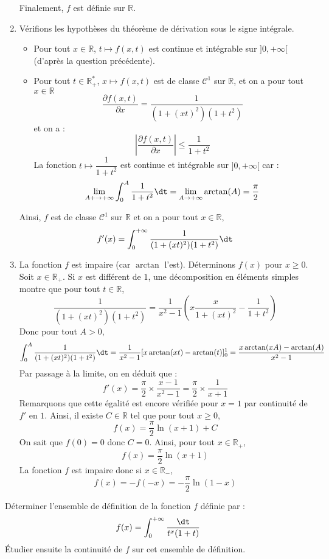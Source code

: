 \documentclass[a4paper,10pt]{report}
\begin{document}
\begin{enumerate}
\noindent Finalement, $f$ est définie sur $\mathbb{R}$.
\item Vérifions les hypothèses du théorème de dérivation sous le signe intégrale.
\begin{itemize}
\item Pour tout $x \in \mathbb{R}$, $t \mapsto f(x,t)$ est continue et intégrable sur $]0, + \infty[$ (d'après la question précédente).
\item Pour tout $t \in \mathbb{R}_+^{*}$, $x \mapsto f(x,t)$ est de classe $\mathcal{C}^1$ sur $\mathbb{R}$, et on a pour tout $x \in \mathbb{R}$
$$ \dfrac{\partial f(x,t)}{\partial x} = \dfrac{1}{(1+(xt)^2)(1+t^2)}$$
et on a :
$$ \left\vert \dfrac{\partial f(x,t)}{\partial x} \right\vert \leq \dfrac{1}{1+t^2}$$
La fonction $t \mapsto \dfrac{1}{1+t^2}$ est continue et intégrable sur $]0, + \infty[$ car :
$$ \lim_{A + \rightarrow + \infty} \int_{0}^A \dfrac{1}{1+t^2} \dt = \lim_{A \rightarrow + \infty} \arctan(A) = \dfrac{\pi}{2}$$
\end{itemize}
Ainsi, $f$ est de classe $\mathcal{C}^1$ sur $\mathbb{R}$ et on a pour tout $x \in \mathbb{R}$,
$$ f'(x) = \int_{0}^{+ \infty} \dfrac{1}{(1+(xt)^2)(1+t^2)} \dt$$
\item La fonction $f$ est impaire (car $\arctan$ l'est). Déterminons $f(x)$ pour $x \geq 0$. Soit $x \in \mathbb{R}_+$. Si $x$ est différent de $1$, une décomposition en éléments simples montre que pour tout $t \in \mathbb{R}$,
$$ \dfrac{1}{(1+(xt)^2)(1+t^2)} = \dfrac{1}{x^2-1} \left( x\dfrac{x}{1+(xt)^2} - \dfrac{1}{1+t^2} \right)$$
Donc pour tout $A>0$,
$$ \int_{0}^A \dfrac{1}{(1+(xt)^2)(1+t^2)} \dt = \dfrac{1}{x^2-1} [ x \arctan(xt)- \arctan(t) ]_0^1 = \dfrac{x\arctan(xA) - \arctan(A)}{x^2-1}$$
Par passage à la limite, on en déduit que :
$$ f'(x) = \dfrac{\pi}{2} \times \dfrac{x-1}{x^2-1} = \dfrac{\pi}{2} \times \dfrac{1}{x+1}$$
Remarquons que cette égalité est encore vérifiée pour $x=1$ par continuité de $f'$ en $1$. Ainsi, il existe $C \in \mathbb{R}$ tel que pour tout $x \geq 0$,
$$ f(x) = \dfrac{\pi}{2} \ln(x+1) + C$$
On sait que $f(0)=0$ donc $C=0$. Ainsi, pour tout $x \in \mathbb{R}_+$,
$$ f(x) = \dfrac{\pi}{2} \ln(x+1) $$
La fonction $f$ est impaire donc si $x \in \mathbb{R}_{-}$,
$$ f(x) = - f(-x) = -\dfrac{\pi}{2} \ln(1-x)$$
\end{enumerate}

\begin{Exa} Déterminer l'ensemble de définition de la fonction $f$ définie par :
$$ f(x) = \int_{0}^{+ \infty} \dfrac{\dt}{t^x(1+t)}$$
Étudier ensuite la continuité de $f$ sur cet ensemble de définition.
\end{Exa}
\end{document}
